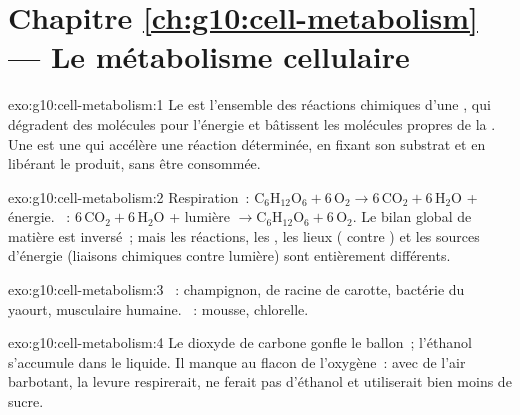 \section*{Chapitre \ref{ch:g10:cell-metabolism} --- Le métabolisme cellulaire}

\begin{solution}{exo:g10:cell-metabolism:1}
Le  est l'ensemble des réactions chimiques d'une ,
qui dégradent des molécules pour l'énergie et bâtissent les molécules
propres de la . Une  est une  qui accélère une
réaction déterminée, en fixant son substrat et en libérant le produit,
sans être consommée.
\end{solution}

\begin{solution}{exo:g10:cell-metabolism:2}
Respiration~: $\mathrm{C_6H_{12}O_6} + 6\,\mathrm{O_2} \to
6\,\mathrm{CO_2} + 6\,\mathrm{H_2O}$ + énergie. ~:
$6\,\mathrm{CO_2} + 6\,\mathrm{H_2O}$ + lumière $\to \mathrm{C_6H_{12}O_6}
+ 6\,\mathrm{O_2}$. Le bilan global de matière est inversé~; mais les
réactions, les , les lieux ( contre ) et
les sources d'énergie (liaisons chimiques contre lumière) sont
entièrement différents.
\end{solution}

\begin{solution}{exo:g10:cell-metabolism:3}
~: champignon,  de racine de carotte, bactérie du
yaourt,  musculaire humaine. ~: mousse, chlorelle.
\end{solution}

\begin{solution}{exo:g10:cell-metabolism:4}
Le dioxyde de carbone gonfle le ballon~; l'éthanol s'accumule dans le
liquide. Il manque au flacon de l'oxygène~: avec de l'air barbotant,
la levure respirerait, ne ferait pas d'éthanol et utiliserait bien
moins de sucre.
\end{solution}


